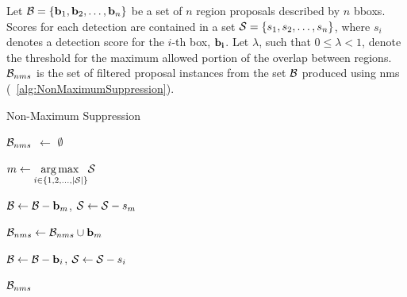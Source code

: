 Let $\mathcal{B} = \left\{ {\mathbf{b}_1, \mathbf{b}_2, \dots, \mathbf{b}_n} \right\}$ be a set of $n$ region proposals described by $n$ \glspl{bbox}. Scores for each detection are contained in a set $\mathcal{S} = \left\{ {s_1, s_2, \dots, s_n} \right\}$, where $s_i$ denotes a detection score for the $i$-th box, $\mathbf{b_i}$. Let $\lambda$, such that $0 \leq \lambda < 1$, denote the threshold for the maximum allowed portion of the overlap between regions. $\mathcal{B}_{nms}$ is the set of filtered proposal instances from the set $\mathcal{B}$ produced using \gls{nms} (\algtext{}~\ref{alg:NonMaximumSuppression}).

\begin{algorithm}[t]
    \caption{Non-Maximum Suppression}
    \label{alg:NonMaximumSuppression}
    \begin{algorithmic}[1]

        \State $\mathcal{B}_{nms}$ $\gets$ $\emptyset$


        \State $m \gets \underset{i \in \left\{ {1, 2, \dots, \left\vert \mathcal{S} \right\vert} \right\}}{\operatorname*{arg\,max}{}} \mathcal{S}$

        \State $\mathcal{B} \gets \mathcal{B} - \mathbf{b}_m$, $\mathcal{S} \gets \mathcal{S} - s_m$

        \State $\mathcal{B}_{nms} \gets \mathcal{B}_{nms} \cup \mathbf{b}_m$



        \State $\mathcal{B} \gets \mathcal{B} - \mathbf{b}_i$, $\mathcal{S} \gets \mathcal{S} - s_i$
        \EndIf
        \EndFor
        \EndWhile

        \State \Return $\mathcal{B}_{nms}$
        \EndFunction
    \end{algorithmic}
\end{algorithm}
